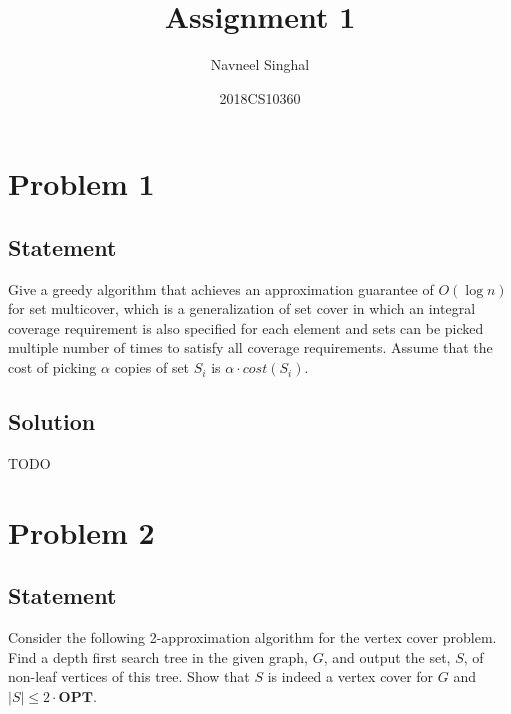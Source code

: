 \documentclass[a4paper]{article}
\title{\textbf{Assignment 1}}
\author{Navneel Singhal}
\date{2018CS10360}
\newcommand{\OPT}{\mathbf{OPT}}
\begin{document}
\maketitle
\tableofcontents

\section{Problem 1}
\subsection{Statement}
Give a greedy algorithm that achieves an approximation guarantee of $O(\log n)$ for set multicover, which is a generalization of set cover in which an integral coverage requirement is also specified
for each element and sets can be picked multiple number of times to satisfy all coverage requirements. Assume that the cost of picking $\alpha$ copies of set $S_i$ is $\alpha \cdot cost(S_i)$.
\subsection{Solution}
TODO

\newpage

\section{Problem 2}
\subsection{Statement}
Consider the following 2-approximation algorithm for the vertex cover problem. Find a depth first search tree in the given graph, $G$, and output the set, $S$, of non-leaf vertices of this tree. Show
that $S$ is indeed a vertex cover for $G$ and $|S| \le 2 \cdot \OPT$.
\end{document}
